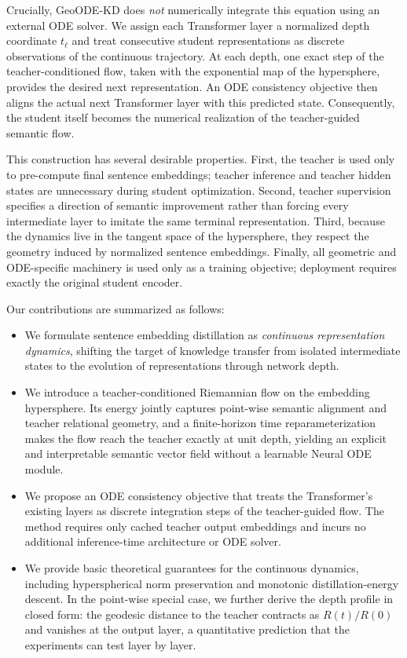 \documentclass[11pt]{article}
\begin{document}
Crucially, GeoODE-KD does \emph{not} numerically integrate this equation
using an external ODE solver. We assign each Transformer layer a normalized
depth coordinate $t_\ell$ and treat consecutive student representations as
discrete observations of the continuous trajectory. At each depth, one
exact step of the teacher-conditioned flow, taken with the exponential map
of the hypersphere, provides the desired next representation. An ODE consistency objective then
aligns the actual next Transformer layer with this predicted state.
Consequently, the student itself becomes the numerical realization of the
teacher-guided semantic flow.

This construction has several desirable properties. First, the teacher is
used only to pre-compute final sentence embeddings; teacher inference and
teacher hidden states are unnecessary during student optimization. Second,
teacher supervision specifies a direction of semantic improvement rather
than forcing every intermediate layer to imitate the same terminal
representation. Third, because the dynamics live in the tangent space of
the hypersphere, they respect the geometry induced by normalized sentence
embeddings. Finally, all geometric and ODE-specific machinery is used only
as a training objective; deployment requires exactly the original student
encoder.

Our contributions are summarized as follows:
\begin{itemize}
    \item We formulate sentence embedding distillation as
    \emph{continuous representation dynamics}, shifting the target of
    knowledge transfer from isolated intermediate states to the evolution
    of representations through network depth.

    \item We introduce a teacher-conditioned Riemannian flow on the
    embedding hypersphere. Its energy jointly captures point-wise semantic
    alignment and teacher relational geometry, and a finite-horizon time
    reparameterization makes the flow reach the teacher exactly at unit
    depth, yielding an explicit and interpretable semantic vector field
    without a learnable Neural ODE module.

    \item We propose an ODE consistency objective that treats the
    Transformer's existing layers as discrete integration steps of the
    teacher-guided flow. The method requires only cached teacher output
    embeddings and incurs no additional inference-time architecture or ODE
    solver.

    \item We provide basic theoretical guarantees for the continuous
    dynamics, including hyperspherical norm preservation and monotonic
    distillation-energy descent. In the point-wise special case, we further
    derive the depth profile in closed form: the geodesic distance to the
    teacher contracts as $R(t)/R(0)$ and vanishes at the output layer, a
    quantitative prediction that the experiments can test layer by layer.
\end{itemize}
\end{document}
